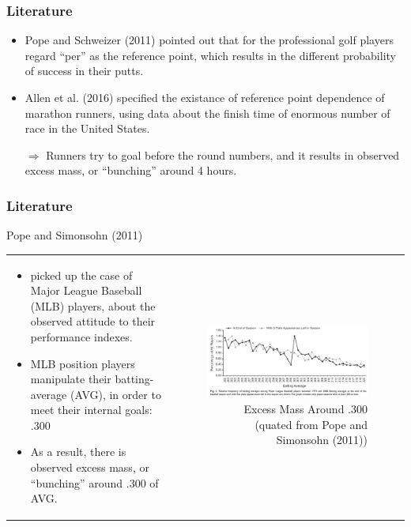 \documentclass[dvipdfmx,12pt]{beamer}
\begin{document}
\begin{frame}\frametitle{Literature}
  \begin{itemize}

    \item Pope and Schweizer (2011) pointed out that for the professional golf players regard ``per'' as the reference point, which results in the different probability of success in their putts.

    \item Allen et al. (2016) specified the existance of reference point dependence of marathon runners, using data about the finish time of enormous number of race in the United States.

    $\Rightarrow$ Runners try to goal before the round numbers, and it results in observed excess mass, or ``bunching'' around 4 hours.

  \end{itemize}

\end{frame}

\begin{frame}\frametitle{Literature}
  \small
  Pope and Simonsohn (2011)
  \begin{tabular}{lr}
    \begin{minipage}[H]{0.45\textwidth}
      \footnotesize
      \begin{itemize}
        \item picked up the case of Major League Baseball (MLB) players, about the observed attitude to their performance indexes.

        \item MLB position players manipulate their batting-average (AVG), in order to meet their internal goals: .300

        \item As a result, there is observed excess mass, or ``bunching'' around .300 of AVG.
      \end{itemize}

    \end{minipage} &
    \begin{minipage}[H]{0.55\textwidth}
      \begin{figure}
        \includegraphics[keepaspectratio, scale = 0.33]{graphs/PS_fig1}
        \caption{Excess Mass Around .300 (quated from Pope and Simonsohn (2011))}
        \label{PS_fig}
      \end{figure}
    \end{minipage}
  \end{tabular}

\end{frame}
\end{document}
